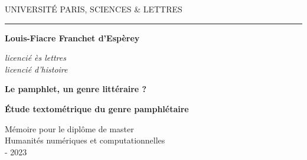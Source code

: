 \begin{titlepage}
\begin{center}

\bigskip

\begin{large}
UNIVERSITÉ PARIS, SCIENCES \& LETTRES
\end{large}
\begin{center}\rule{2cm}{0.02cm}\end{center}

\bigskip
\bigskip
\bigskip
\begin{Large}
\textbf{Louis-Fiacre Franchet d'Espèrey}\\
\end{Large}
\begin{normalsize} \textit{licencié ès lettres}\\
\textit{licencié d'histoire}\\
\end{normalsize}

\bigskip
\bigskip
\bigskip

\begin{Huge}
\textbf{Le pamphlet, un genre littéraire ?}\\
\end{Huge}
\bigskip
\bigskip
\begin{LARGE}
\textbf{Étude textométrique du genre pamphlétaire}\\
\end{LARGE}

\bigskip
\bigskip
\bigskip
\begin{large}
\end{large}
\vfill

\begin{large}
Mémoire 
pour le diplôme de master \\
\og Humanités numériques et computationnelles \fg{} \\
 - 2023
\end{large}

\end{center}
\end{titlepage}